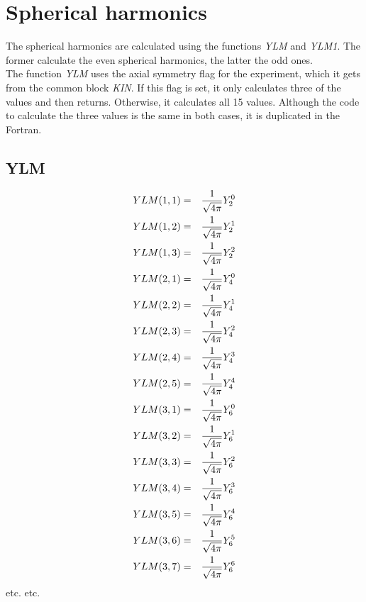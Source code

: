 \chapter{Spherical harmonics}
\label{chapt:spherical}

The spherical harmonics are calculated using the functions {\em YLM} and
{\em YLM1}. The former calculate the even spherical harmonics, the latter
the odd ones.\\

The function {\em YLM} uses the axial symmetry flag for the experiment,
which it gets from the common block {\em KIN}. If this flag is set, it
only calculates three of the values and then returns. Otherwise, it
calculates all 15 values. Although the code to calculate the three values is
the same in both cases, it is duplicated in the Fortran.\\

\section{YLM}
\begin{eqnarray}
YLM(1,1)&=&{1 \over \sqrt{4 \pi}} Y_2^0\nonumber\\
YLM(1,2)&=&{1 \over \sqrt{4 \pi}} Y_2^1\nonumber\\
YLM(1,3)&=&{1 \over \sqrt{4 \pi}} Y_2^2\nonumber\\
YLM(2,1)&=&{1 \over \sqrt{4 \pi}} Y_4^0\nonumber\\
YLM(2,2)&=&{1 \over \sqrt{4 \pi}} Y_4^1\nonumber\\
YLM(2,3)&=&{1 \over \sqrt{4 \pi}} Y_4^2\nonumber\\
YLM(2,4)&=&{1 \over \sqrt{4 \pi}} Y_4^3\nonumber\\
YLM(2,5)&=&{1 \over \sqrt{4 \pi}} Y_4^4\nonumber\\
YLM(3,1)&=&{1 \over \sqrt{4 \pi}} Y_6^0\nonumber\\
YLM(3,2)&=&{1 \over \sqrt{4 \pi}} Y_6^1\nonumber\\
YLM(3,3)&=&{1 \over \sqrt{4 \pi}} Y_6^2\nonumber\\
YLM(3,4)&=&{1 \over \sqrt{4 \pi}} Y_6^3\nonumber\\
YLM(3,5)&=&{1 \over \sqrt{4 \pi}} Y_6^4\nonumber\\
YLM(3,6)&=&{1 \over \sqrt{4 \pi}} Y_6^5\nonumber\\
YLM(3,7)&=&{1 \over \sqrt{4 \pi}} Y_6^6\nonumber\\
\end{eqnarray}
etc. etc.\\

